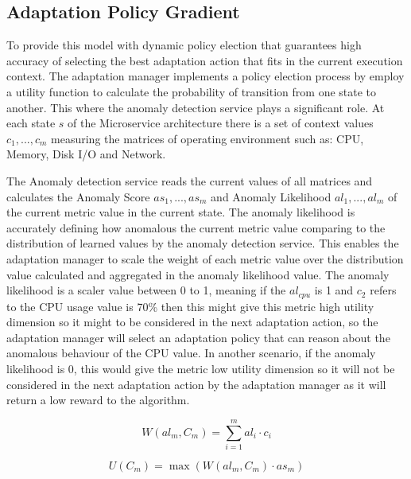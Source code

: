 \documentclass{ieeeaccess}
\begin{document}
\subsection{Adaptation Policy Gradient}
To provide this model with dynamic policy election that guarantees high accuracy of selecting the best adaptation action that fits in the current execution context. The adaptation manager implements a policy election process by employ a utility function to calculate the probability of transition from one state to another. This where the anomaly detection service plays a significant role. At each state $s$ of the Microservice architecture there is a set of context values $c_{1},...,c_{m}$ measuring the matrices of operating environment such as: CPU, Memory, Disk I/O and Network. 

The Anomaly detection service reads the current values of all matrices and calculates the Anomaly Score $as_{1},..., as_{m}$ and Anomaly Likelihood $al_{1},...,al_{m}$ of the current metric value in the current state. The anomaly likelihood is accurately defining how anomalous the current metric value comparing to the distribution of learned values by the anomaly detection service. This enables the adaptation manager to scale the weight of each metric value over the distribution value calculated and aggregated in the anomaly likelihood value. The anomaly likelihood is a scaler value between 0 to 1, meaning if the $al_{cpu}$ is 1 and $c_{2}$ refers to the CPU usage value is 70\% then this might give this metric high utility dimension so it might to be considered in the next adaptation action, so the adaptation manager will select an adaptation policy that can reason about the anomalous behaviour of the CPU value. In another scenario, if the anomaly likelihood is 0, this would give the metric low utility dimension so it will not be considered in the next adaptation action by the adaptation manager as it will return a low reward to the algorithm. 
 
 
\begin{equation}
\label{eq_1}
W(al_{m},C_{m}) =  \sum_{i=1}^{m} al_{i} \cdot  c_{i}
\end{equation}

 \begin{equation}
\label{eq_2}
U(C_{m}) =  \max  (W(al_{m},C_{m}) \cdot  as_{m})
\end{equation}

 
 
\end{document}
